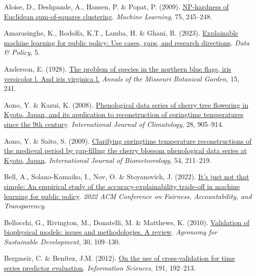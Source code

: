 \documentclass[
  letterpaper,
]{scrbook}
\newlength{\cslhangindent}
\newenvironment{CSLReferences}[2] %
 {\begin{list}{}{%
  \setlength{\itemindent}{0pt}
  \setlength{\leftmargin}{0pt}
  \setlength{\parsep}{0pt}
  \ifodd #1
   \setlength{\leftmargin}{\cslhangindent}
   \setlength{\itemindent}{-1\cslhangindent}
  \fi
  \setlength{\itemsep}{#2\baselineskip}}}
 {\end{list}}
\begin{document}
\label{refs}
\begin{CSLReferences}{1}{0}
Aloise, D., Deshpande, A., Hansen, P. \& Popat, P. (2009).
\href{https://doi.org/10.1007/s10994-009-5103-0}{NP-hardness of
Euclidean sum-of-squares clustering}. \emph{Machine Learning}, 75,
245--248.

Amarasinghe, K., Rodolfa, K.T., Lamba, H. \& Ghani, R. (2023).
\href{https://doi.org/10.1017/dap.2023.2}{Explainable machine learning
for public policy: Use cases, gaps, and research directions}. \emph{Data
\& Policy}, 5.

Anderson, E. (1928). \href{https://doi.org/10.2307/2394087}{The problem
of species in the northern blue flags, iris versicolor l. And iris
virginica l.} \emph{Annals of the Missouri Botanical Garden}, 15, 241.

Aono, Y. \& Kazui, K. (2008).
\href{https://doi.org/10.1002/joc.1594}{Phenological data series of
cherry tree flowering in Kyoto, Japan, and its application to
reconstruction of springtime temperatures since the 9th century}.
\emph{International Journal of Climatology}, 28, 905--914.

Aono, Y. \& Saito, S. (2009).
\href{https://doi.org/10.1007/s00484-009-0272-x}{Clarifying springtime
temperature reconstructions of the medieval period by gap-filling the
cherry blossom phenological data series at Kyoto, Japan}.
\emph{International Journal of Biometeorology}, 54, 211--219.

Bell, A., Solano-Kamaiko, I., Nov, O. \& Stoyanovich, J. (2022).
\href{https://doi.org/10.1145/3531146.3533090}{It{'}s just not that
simple: An empirical study of the accuracy-explainability trade-off in
machine learning for public policy}. \emph{2022 ACM Conference on
Fairness, Accountability, and Transparency}.

Bellocchi, G., Rivington, M., Donatelli, M. \& Matthews, K. (2010).
\href{https://doi.org/10.1051/agro/2009001}{Validation of biophysical
models: issues and methodologies. A review}. \emph{Agronomy for
Sustainable Development}, 30, 109--130.

Bergmeir, C. \& Benítez, J.M. (2012).
\href{https://doi.org/10.1016/j.ins.2011.12.028}{On the use of
cross-validation for time series predictor evaluation}.
\emph{Information Sciences}, 191, 192--213.


\end{CSLReferences}
\end{document}
